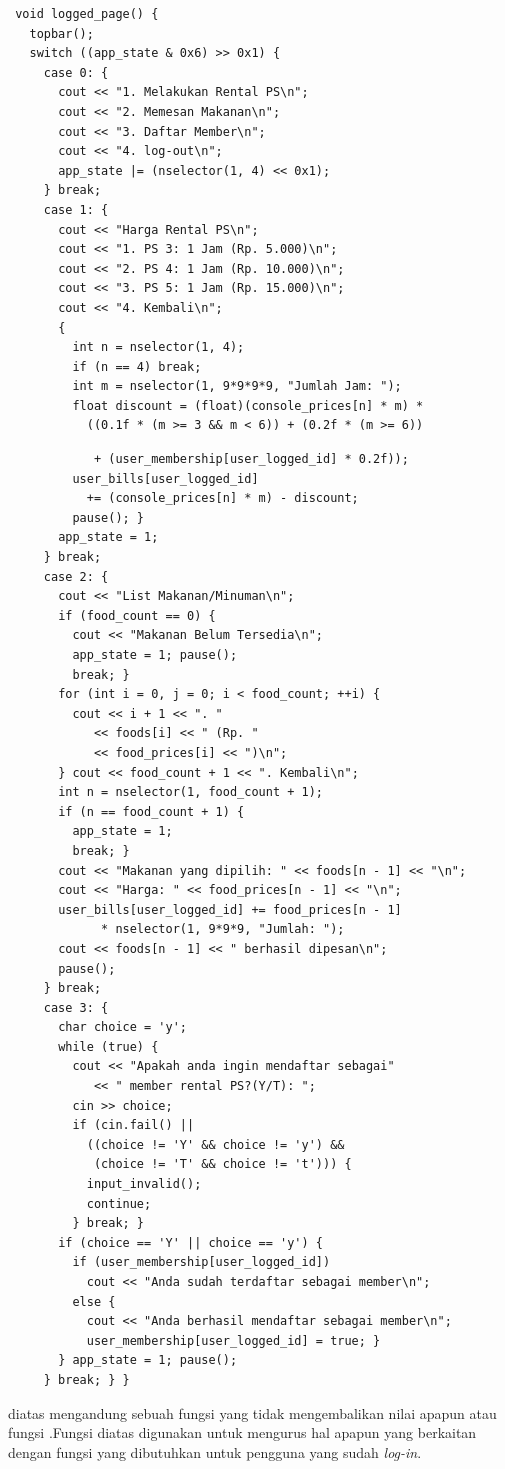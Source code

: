 \documentclass[../main.tex]{subfiles}
\begin{document}
\begin{lstlisting}
 void logged_page() {
   topbar();
   switch ((app_state & 0x6) >> 0x1) {
     case 0: {
       cout << "1. Melakukan Rental PS\n";
       cout << "2. Memesan Makanan\n";
       cout << "3. Daftar Member\n";
       cout << "4. log-out\n";
       app_state |= (nselector(1, 4) << 0x1);
     } break;
     case 1: {
       cout << "Harga Rental PS\n";
       cout << "1. PS 3: 1 Jam (Rp. 5.000)\n";
       cout << "2. PS 4: 1 Jam (Rp. 10.000)\n";
       cout << "3. PS 5: 1 Jam (Rp. 15.000)\n";
       cout << "4. Kembali\n";
       {
         int n = nselector(1, 4);
         if (n == 4) break;
         int m = nselector(1, 9*9*9*9, "Jumlah Jam: ");
         float discount = (float)(console_prices[n] * m) *
           ((0.1f * (m >= 3 && m < 6)) + (0.2f * (m >= 6))
\end{lstlisting}
\begin{lstlisting}
            + (user_membership[user_logged_id] * 0.2f));
         user_bills[user_logged_id]
           += (console_prices[n] * m) - discount;
         pause(); }
       app_state = 1;
     } break;
     case 2: {
       cout << "List Makanan/Minuman\n";
       if (food_count == 0) {
         cout << "Makanan Belum Tersedia\n";
         app_state = 1; pause();
         break; }
       for (int i = 0, j = 0; i < food_count; ++i) {
         cout << i + 1 << ". "
            << foods[i] << " (Rp. "
            << food_prices[i] << ")\n";
       } cout << food_count + 1 << ". Kembali\n";
       int n = nselector(1, food_count + 1);
       if (n == food_count + 1) {
         app_state = 1;
         break; }
       cout << "Makanan yang dipilih: " << foods[n - 1] << "\n";
       cout << "Harga: " << food_prices[n - 1] << "\n";
       user_bills[user_logged_id] += food_prices[n - 1]
             * nselector(1, 9*9*9, "Jumlah: ");
       cout << foods[n - 1] << " berhasil dipesan\n";
       pause();
     } break;
     case 3: {
       char choice = 'y';
       while (true) {
         cout << "Apakah anda ingin mendaftar sebagai"
            << " member rental PS?(Y/T): ";
         cin >> choice;
         if (cin.fail() ||
           ((choice != 'Y' && choice != 'y') &&
            (choice != 'T' && choice != 't'))) {
           input_invalid();
           continue;
         } break; }
       if (choice == 'Y' || choice == 'y') {
         if (user_membership[user_logged_id])
           cout << "Anda sudah terdaftar sebagai member\n";
         else {
           cout << "Anda berhasil mendaftar sebagai member\n";
           user_membership[user_logged_id] = true; }
       } app_state = 1; pause();
     } break; } }
\end{lstlisting}
    \ilz{}{\Script} diatas mengandung sebuah fungsi yang tidak mengembalikan nilai apapun atau fungsi .Fungsi diatas digunakan untuk mengurus hal apapun yang berkaitan dengan fungsi yang dibutuhkan untuk pengguna yang sudah \textit{log-in}.
\end{document}
